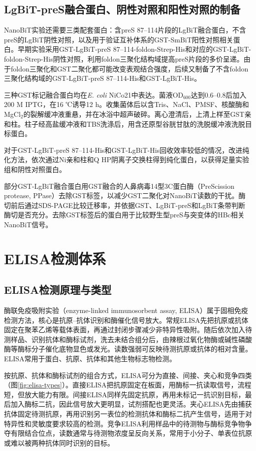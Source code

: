 \subsection{LgBiT-preS融合蛋白、阴性对照和阳性对照的制备}

NanoBiT实验还需要三类配套蛋白：含preS 87--114片段的LgBiT融合蛋白，不含preS的LgBiT阴性对照，以及用于验证互补体系的GST-SmBiT阳性对照相关蛋白。早期实验采用GST-LgBiT-preS 87--114-foldon-Strep-His和对应的GST-LgBiT-foldon-Strep-His阴性对照，利用foldon三聚化结构域提高preS片段的多价呈递。由于foldon三聚化和GST二聚化都可能改变表观结合强度，后续又制备了不含foldon三聚化结构域的GST-LgBiT-preS 87--114-His和GST-LgBiT-His。

三种GST标记融合蛋白均在\textit{E. coli} NiCo21中表达。菌液OD$_{600}$达到0.6--0.8后加入200 \textmu M IPTG，在16 ℃诱导12 h。收集菌体后以含Tris、NaCl、PMSF、核酸酶和MgCl$_2$的裂解缓冲液重悬，并在冰浴中超声破碎。离心澄清后，上清上样至GST亲和柱。柱子经高盐缓冲液和TBS洗涤后，用含还原型谷胱甘肽的洗脱缓冲液洗脱目标蛋白。

对于GST-LgBiT-preS 87--114-His和GST-LgBiT-His回收效率较低的情况，改进纯化方法，依次通过Ni亲和柱和Q HP阴离子交换柱得到纯化蛋白，以获得足量实验组和阴性对照蛋白。

部分GST-LgBiT融合蛋白用GST融合的人鼻病毒14型3C蛋白酶（PreScission protease, PPase）去除GST标签，以减少GST二聚化对NanoBiT读数的干扰。酶切前后通过SDS-PAGE比较迁移率，并依据GST、LgBiT-preS和LgBiT条带判断酶切是否充分。去除GST标签后的蛋白用于比较野生型preS与突变体的HBc相关NanoBiT信号。

\section{ELISA检测体系}

\subsection{ELISA检测原理与类型}

酶联免疫吸附实验（enzyme-linked immunosorbent assay, ELISA）属于固相免疫检测方法，核心是抗原--抗体识别和酶催化信号放大。常规ELISA先把抗原或抗体固定在聚苯乙烯等载体表面，再通过封闭步骤减少非特异性吸附。随后依次加入待测样品、识别抗体和酶标试剂，洗去未结合组分后，由辣根过氧化物酶或碱性磷酸酶等酶标分子催化底物显色或发光。读数强弱可反映待测抗原或抗体的相对含量\cite{aydin2015short,ahirwar2022unveiling}。ELISA常用于蛋白、抗原、抗体和其他生物标志物检测\cite{ahirwar2022unveiling}。

按抗原、抗体和酶标试剂的组合方式，ELISA可分为直接、间接、夹心和竞争四类（图\ref{fig:elisa-types}）。直接ELISA把抗原固定在板面，用酶标一抗读取信号，流程短，但放大能力有限。间接ELISA同样先固定抗原，再用未标记一抗识别目标，最后加入酶标二抗，因此信号放大更明显，试剂搭配也更灵活。夹心ELISA先由捕获抗体固定待测抗原，再用识别另一表位的检测抗体和酶标二抗产生信号，适用于对特异性和灵敏度要求较高的检测。竞争ELISA利用样品中的待测物与酶标竞争物争夺有限结合位点，读数通常与待测物浓度呈反向关系，常用于小分子、单表位抗原或难以被两种抗体同时识别的目标\cite{aydin2015short,ahirwar2022unveiling}。

